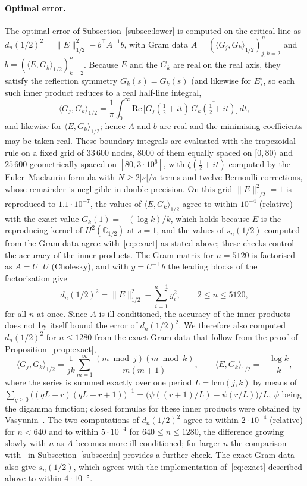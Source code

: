 \documentclass[11pt]{extarticle}
\numberwithin{equation}{section}
\theoremstyle{plain}
\theoremstyle{remark}
\begin{document}
\paragraph{Optimal error.} The optimal error of Subsection~\ref{subsec:lower} is
computed on the critical line as
$d_n(1/2)^2 = \|E\|^2_{1/2} - b^{\top} A^{-1} b$, with Gram data
$A = (\langle G_j, G_k \rangle_{1/2})_{j,k=2}^{n}$ and
$b = (\langle E, G_k \rangle_{1/2})_{k=2}^{n}$. Because $E$ and the $G_k$ are
real on the real axis, they satisfy the reflection symmetry
$G_k(\bar s) = \overline{G_k(s)}$ (and likewise for $E$), so each such inner
product reduces to a real half-line integral,
\[
\langle G_j, G_k \rangle_{1/2}
= \frac{1}{\pi} \int_0^\infty \mathrm{Re}\,\bigl[G_j(\tfrac12+it)\,\overline{G_k(\tfrac12+it)}\bigr]\,dt,
\]
and likewise for $\langle E, G_k \rangle_{1/2}$; hence $A$ and $b$ are real and the
minimising coefficients may be taken real. These boundary integrals are evaluated with
the trapezoidal rule on a fixed grid of $33\,600$ nodes, $8000$ of them equally spaced
on $[0, 80)$ and $25\,600$ geometrically spaced on $[80, 3 \cdot 10^6]$, with
$\zeta(\tfrac12 + it)$ computed by the Euler--Maclaurin formula with $N \geq 2|s|/\pi$
terms and twelve Bernoulli corrections, whose remainder is negligible in double
precision. On this grid $\|E\|^2_{1/2} = 1$ is reproduced to $1.1 \cdot 10^{-7}$, the
values of $\langle E, G_k \rangle_{1/2}$ agree to within $10^{-4}$ (relative) with the
exact value $G_k(1) = -(\log k)/k$, which holds because $E$ is the reproducing kernel of
$H^2(\mathbb{C}_{1/2})$ at $s = 1$, and the values of $s_n(1/2)$ computed from the Gram
data agree with~\eqref{eq:exact} as stated above; these checks control the accuracy
of the inner products. The Gram matrix for $n = 5120$ is
factorised as $A = U^{\top} U$ (Cholesky), and with $y = U^{-\top} b$ the leading blocks
of the factorisation give
\[
d_n(1/2)^2 = \|E\|^2_{1/2} - \sum_{i=1}^{n-1} y_i^2, \qquad 2 \leq n \leq 5120,
\]
for all $n$ at once. Since $A$ is ill-conditioned, the accuracy of the inner
products does not by itself bound the error of $d_n(1/2)^2$. We therefore also
computed $d_n(1/2)^2$ for $n \leq 1280$ from the exact Gram data that follow from the
proof of Proposition~\ref{prop:exact},
\[
\langle G_j, G_k \rangle_{1/2} = \frac{1}{jk} \sum_{m=1}^{\infty}
\frac{(m \bmod j)(m \bmod k)}{m(m+1)},
\qquad
\langle E, G_k \rangle_{1/2} = -\frac{\log k}{k},
\]
where the series is summed exactly over one period $L = \mathrm{lcm}(j,k)$ by means of
$\sum_{q \geq 0} \bigl((qL + r)(qL + r + 1)\bigr)^{-1} = \bigl(\psi((r+1)/L) - \psi(r/L)\bigr)/L$,
$\psi$ being the digamma function; closed formulas for these inner products were
obtained by Vasyunin~\cite{vasyunin}. The two computations of $d_n(1/2)^2$ agree to
within $2 \cdot 10^{-4}$ (relative) for $n < 640$ and to within $5 \cdot 10^{-4}$ for
$640 \leq n \leq 1280$, the difference growing slowly with $n$ as $A$ becomes more
ill-conditioned; for larger $n$ the comparison with~\cite{BBLS} in
Subsection~\ref{subsec:dn} provides a further check. The exact Gram data also give
$s_n(1/2)$, which agrees with the implementation of~\eqref{eq:exact} described above to
within $4 \cdot 10^{-8}$.
\end{document}
